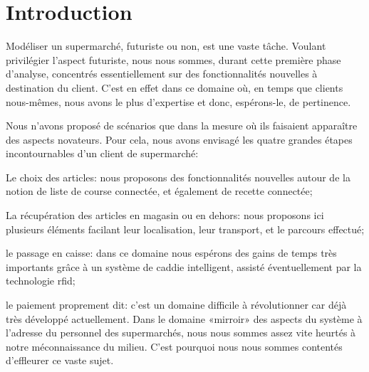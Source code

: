 \chapter{Introduction}

Modéliser un supermarché, futuriste ou non, est une vaste tâche.
Voulant privilégier l'aspect futuriste, nous nous sommes, durant cette première phase d'analyse, concentrés essentiellement sur des fonctionnalités nouvelles à destination du client.
C'est en effet dans ce domaine où, en temps que clients nous-mêmes, nous avons le plus d'expertise et donc, espérons-le, de pertinence.\par
Nous n'avons proposé de scénarios que dans la mesure où ils faisaient apparaître des aspects novateurs.
Pour cela, nous avons envisagé les quatre grandes étapes incontournables d'un client de supermarché:
\startitemize[n]
\item Le choix des articles: nous proposons des fonctionnalités nouvelles autour de la notion de liste de course connectée, et également de recette connectée;
\item La récupération des articles en magasin ou en dehors: nous proposons ici plusieurs éléments facilant leur localisation, leur transport, et le parcours effectué;
\item le passage en caisse: dans ce domaine nous espérons des gains de temps très importants grâce à un système de caddie intelligent, assisté éventuellement par la technologie rfid;
\item le paiement proprement dit: c'est un domaine difficile à révolutionner car déjà très développé actuellement.
\stopitemize
\blank
Dans le domaine «mirroir» des aspects du système à l'adresse du personnel des supermarchés, nous nous sommes assez vite heurtés à notre méconnaissance du milieu.
C'est pourquoi nous nous sommes contentés d'effleurer ce vaste sujet.

